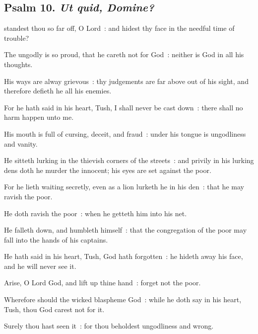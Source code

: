 \clearpage
\subsection{Psalm 10. \textit{Ut quid, Domine?}}


 standest thou so far off, O Lord~: and hidest thy face in the needful time of trouble?\par
{}
The ungodly is so proud, that he careth not for God~: neither is God in all his thoughts.\par
{}His ways are alway grievous~: thy judgements are far above out of his sight, and therefore defieth he all his enemies.\par
{}For he hath said in his heart, Tush, I shall never be cast down~: there shall no harm happen unto me.\par
{}His mouth is full of cursing, deceit, and fraud~: under his tongue is ungodliness and vanity.\par
{}He sitteth lurking in the thievish corners of the streets~: and privily in his lurking dens doth he murder the innocent; his eyes are set against the poor.\par
{}For he lieth waiting secretly, even as a lion lurketh he in his den~: that he may ravish the poor.\par
{}He doth ravish the poor~: when he getteth him into his net.\par
{}He falleth down, and humbleth himself~: that the congregation of the poor may fall into the hands of his captains.\par
{}He hath said in his heart, Tush, God hath forgotten~: he hideth away his face, and he will never see it.\par
{}Arise, O Lord God, and lift up thine hand~: forget not the poor.\par
{}Wherefore should the wicked blaspheme God~: while he doth say in his heart, Tush, thou God carest not for it.\par
{}Surely thou hast seen it~: for thou beholdest ungodliness and wrong.\par
